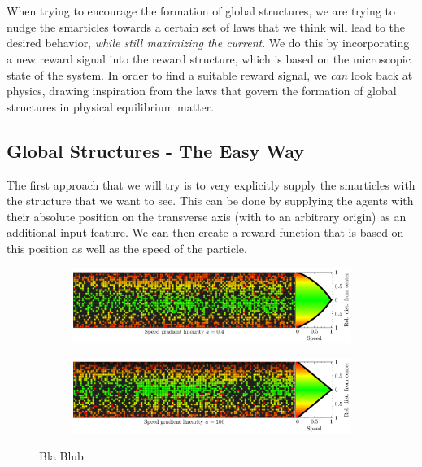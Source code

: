 \\
\\
When trying to encourage the formation of global structures, we are trying to nudge the smarticles towards a certain set of laws that we think will lead to the desired behavior, \textit{while still maximizing the current}. We do this by incorporating a new reward signal into the reward structure, which is based on the microscopic state of the system. In order to find a suitable reward signal, we \textit{can} look back at physics, drawing inspiration from the laws that govern the formation of global structures in physical equilibrium matter.

\subsection{Global Structures - The Easy Way}
\label{sec:global_structure_easy}
The first approach that we will try is to very explicitly supply the smarticles with the structure that we want to see. This can be done by supplying the agents with their absolute position on the transverse axis (with to an arbitrary origin) as an additional input feature. We can then create a reward function that is based on this position as well as the speed of the particle. 

\begin{figure}[h]
\centering
\begin{subfigure}{\textwidth}
    \centering
    \includegraphics[width=\textwidth]{speed_gradient_0.4}
\end{subfigure}
\begin{subfigure}{\textwidth}
    \centering
    \includegraphics[width=\textwidth]{speed_gradient_100}
\end{subfigure}
\caption{Bla Blub}
\label{fig:speed_gradient}
\end{figure}
